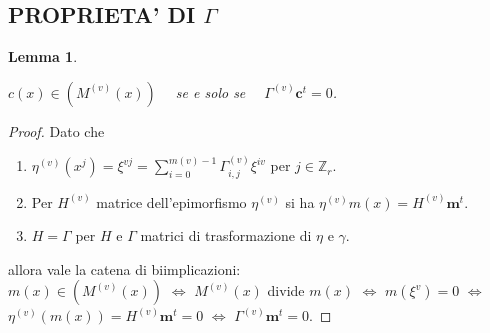 \documentclass[mathserif]{beamer}
\newtheorem{lemmax}{Lemma}[section]
\newtheorem{teorema}{Teorema}
\begin{document}
%

\subsection{PROPRIETA' DI $\Gamma$}
\begin{frame}
    \begin{lemmax}
    \begin{center}
      $c(x) \in (M^{(v)}(x))\quad $ se e solo se $ \quad \Gamma^{(v)} \mathbf{c}^{t} = 0$.
    \end{center}
    \end{lemmax}
    \begin{proof}
      Dato che
      \begin{enumerate}
	  \item $\eta^{(v)}(x^{j}) = \xi^{vj} = \sum_{i=0}^{m(v)-1}\Gamma_{i,j}^{(v)}\xi^{iv}$ per $j \in \mathbb{Z}_{r}$.
	  \item Per $H^{(v)}$ matrice dell'epimorfismo $\eta^{(v)}$ si ha $\eta^{(v)}m(x) = H^{(v)}\mathbf{m}^{t}$.
	  \item $H=\Gamma$ per $H$ e $\Gamma$ matrici di trasformazione di $\eta$ e $\gamma$.
      \end{enumerate}
      allora vale la catena di biimplicazioni:\\
      $m(x)\in (M^{(v)}(x))$ $\iff$ $M^{(v)}(x)$ divide $m(x)$ $\iff$ $m(\xi^{v}) = 0$ $\iff$ $\eta^{(v)}(m(x)) = H^{(v)}\mathbf{m}^{t} = 0$ $\iff$ $ \Gamma^{(v)}\mathbf{m}^{t} = 0$.
    \end{proof}

\end{frame}
\end{document}
